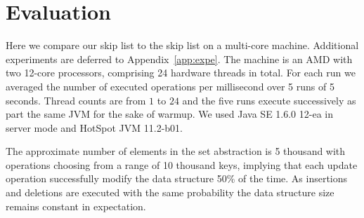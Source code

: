 
\section{Evaluation}\label{sec:expe}
Here we compare our skip list to the  skip list on a multi-core machine. 
Additional experiments are deferred to Appendix~\ref{app:expe}.
The machine is an AMD with two 12-core processors, comprising 24 hardware threads 
in total. For each run we averaged the number of
executed operations per millisecond over 5 runs of 5 seconds. 
Thread counts are from $1$ to $24$ and the five runs execute 
successively as part the same JVM for the sake of warmup.
We used Java SE 1.6.0 12-ea in server mode and HotSpot JVM 11.2-b01.

The approximate number of elements in the set abstraction is 5 thousand with
operations choosing from a range of 10 thousand keys, implying that each update 
operation successfully modify the data structure 50\% of the time. As insertions and deletions
are executed with the same probability the data structure size remains constant in expectation.

